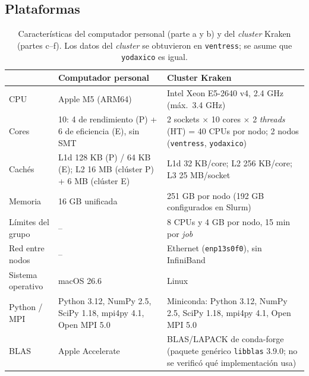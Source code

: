 \documentclass[11pt,a4paper]{article}
\begin{document}
\subsection{Plataformas}
\begin{table}[H]
\centering\small
\caption{Características del computador personal (parte a y b) y del \emph{cluster} Kraken (partes c--f). Los datos del \emph{cluster} se obtuvieron en \texttt{ventress}; se asume que \texttt{yodaxico} es igual.}
\label{tab:maquinas}
\begin{tabular}{lp{5.2cm}p{6.2cm}}
\toprule
 & \textbf{Computador personal} & \textbf{Cluster Kraken} \\
\midrule
CPU & Apple M5 (ARM64) & Intel Xeon E5-2640 v4, 2.4 GHz (máx.\ 3.4 GHz) \\
Cores & 10: 4 de rendimiento (P) + 6 de eficiencia (E), sin SMT & 2 sockets $\times$ 10 cores $\times$ 2 \emph{threads} (HT) = 40 CPUs por nodo; 2 nodos (\texttt{ventress}, \texttt{yodaxico}) \\
Cachés & L1d 128 KB (P) / 64 KB (E); L2 16 MB (clúster P) + 6 MB (clúster E) & L1d 32 KB/core; L2 256 KB/core; L3 25 MB/socket \\
Memoria & 16 GB unificada & 251 GB por nodo (192 GB configurados en Slurm) \\
Límites del grupo & -- & 8 CPUs y 4 GB por nodo, 15 min por \emph{job} \\
Red entre nodos & -- & Ethernet (\texttt{enp13s0f0}), sin InfiniBand \\
Sistema operativo & macOS 26.6 & Linux \\
Python / MPI & Python 3.12, NumPy 2.5, SciPy 1.18, mpi4py 4.1, Open MPI 5.0 & Miniconda: Python 3.12, NumPy 2.5, SciPy 1.18, mpi4py 4.1, Open MPI 5.0 \\
BLAS & Apple Accelerate & BLAS/LAPACK de conda-forge (paquete genérico \texttt{libblas} 3.9.0; no se verificó qué implementación usa) \\
\bottomrule
\end{tabular}
\end{table}
\end{document}
